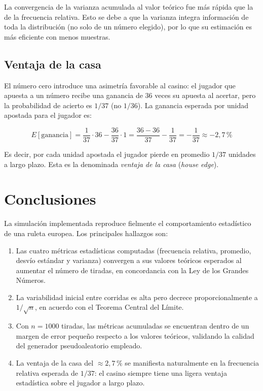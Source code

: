 \documentclass[a4paper, 11pt]{article}
\begin{document}
La convergencia de la varianza acumulada al valor teórico fue más rápida
que la de la frecuencia relativa. Esto se debe a que la varianza integra
información de toda la distribución (no solo de un número elegido), por lo
que su estimación es más eficiente con menos muestras.

\subsection{Ventaja de la casa}

El número cero introduce una asimetría favorable al casino: el jugador que
apuesta a un número recibe una ganancia de $36$ veces su apuesta al acertar,
pero la probabilidad de acierto es $1/37$ (no $1/36$). La ganancia esperada
por unidad apostada para el jugador es:

\begin{equation}
  E[\text{ganancia}] = \frac{1}{37} \cdot 36 - \frac{36}{37} \cdot 1
    = \frac{36 - 36}{37} - \frac{1}{37} = -\frac{1}{37} \approx -2{,}7\,\%
  \label{eq:ventaja_casa}
\end{equation}

Es decir, por cada unidad apostada el jugador pierde en promedio $1/37$
unidades a largo plazo. Esta es la denominada \textit{ventaja de la casa}
(\textit{house edge}).

\section{Conclusiones}

La simulación implementada reproduce fielmente el comportamiento estadístico
de una ruleta europea. Los principales hallazgos son:

\begin{enumerate}
  \item Las cuatro métricas estadísticas computadas (frecuencia relativa,
        promedio, desvío estándar y varianza) convergen a sus valores teóricos
        esperados al aumentar el número de tiradas, en concordancia con la
        Ley de los Grandes Números.

  \item La variabilidad inicial entre corridas es alta pero decrece
        proporcionalmente a $1/\sqrt{n}$, en acuerdo con el Teorema Central
        del Límite.

  \item Con $n = 1000$ tiradas, las métricas acumuladas se encuentran dentro
        de un margen de error pequeño respecto a los valores teóricos,
        validando la calidad del generador pseudoaleatorio empleado.

  \item La ventaja de la casa del $\approx 2{,}7\,\%$ se manifiesta
        naturalmente en la frecuencia relativa esperada de $1/37$: el casino
        siempre tiene una ligera ventaja estadística sobre el jugador a largo
        plazo.
\end{enumerate}
\end{document}
